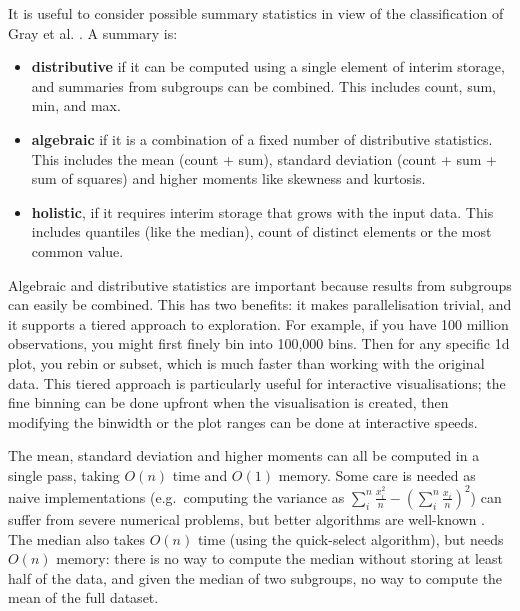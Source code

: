 \documentclass[journal]{vgtc}                %
\begin{document}
It is useful to consider possible summary statistics in view of the classification of Gray et al. \citep{gray:1997}. A summary is:

\begin{itemize}
  \item {\bf distributive} if it can be computed using a single element of interim storage, and summaries from subgroups can be combined. This includes count, sum, min, and max.
  
  \item {\bf algebraic} if it is a combination of a fixed number of distributive statistics. This includes the mean (count + sum), standard deviation (count + sum + sum of squares) and higher moments like skewness and kurtosis.
  
  \item {\bf holistic}, if it requires interim storage that grows with the input data. This includes quantiles (like the median), count of distinct elements or the most common value. 

\end{itemize}

Algebraic and distributive statistics are important because results from subgroups can easily be combined. This has two benefits: it makes parallelisation trivial, and it supports a tiered approach to exploration. For example, if you have 100 million observations, you might first finely bin into 100,000 bins. Then for any specific 1d plot, you rebin or subset, which is much faster than working with the original data. This tiered approach is particularly useful for interactive visualisations; the fine binning can be done upfront when the visualisation is created, then modifying the binwidth or the plot ranges can be done at interactive speeds.

The mean, standard deviation and higher moments can all be computed in a single pass, taking $O(n)$ time and $O(1)$ memory. Some care is needed as naive implementations (e.g.\ computing the variance as $\sum_i^n \frac{x_i^2}{n} - \left( \sum_i^n \frac{x_i}{n} \right)^2$) can suffer from severe numerical problems, but better algorithms are well-known \citep{welford:1962}. The median also takes $O(n)$ time (using the quick-select algorithm), but needs $O(n)$ memory: there is no way to compute the median without storing at least half of the data, and given the median of two subgroups, no way to compute the mean of the full dataset.
\end{document}

